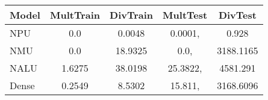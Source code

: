 \begin{tabular}{lcccc}
\toprule
Model & MultTrain & DivTrain & MultTest & DivTest\\
\midrule
NPU & 0.0 & 0.0048 & 0.0001, & 0.928 \\
NMU & 0.0 & 18.9325 & 0.0, & 3188.1165 \\
NALU & 1.6275 & 38.0198 & 25.3822, & 4581.291 \\
Dense & 0.2549 & 8.5302 & 15.811, & 3168.6096 \\
\bottomrule
\end{tabular}
